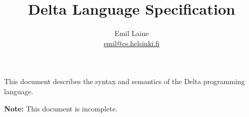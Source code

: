 \documentclass[oneside]{memoir}
\begin{document}
\title{Delta Language Specification}
\author{Emil Laine \\ \href{mailto:emil@cs.helsinki.fi}{emil@cs.helsinki.fi}}
\maketitle

This document describes the syntax and semantics of the Delta programming language.

\textbf{Note:} This document is incomplete.

\tableofcontents







\end{document}
